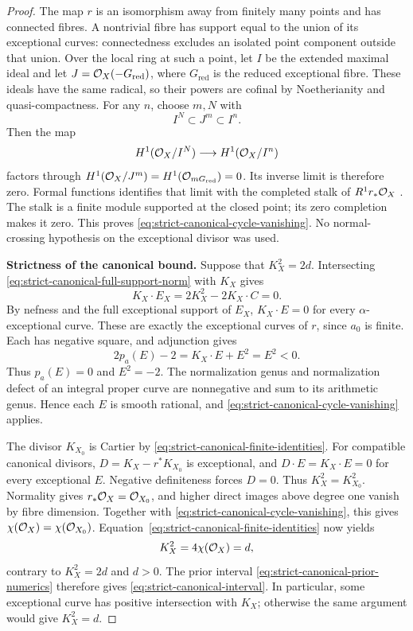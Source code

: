 \begin{proof}
The map $r$ is an isomorphism away from finitely many points
and has connected fibres.  A nontrivial fibre has support
equal to the union of its exceptional curves: connectedness
excludes an isolated point component outside that union.
Over the local ring at such a point, let $I$ be the extended
maximal ideal and let $J=\mathcal O_X(-G_{\mathrm{red}})$, where
$G_{\mathrm{red}}$ is the reduced exceptional fibre.
These ideals have the same radical, so their powers are cofinal
by Noetherianity and quasi-compactness.
For any $n$, choose $m,N$ with
\[
 I^N\subset J^m\subset I^n.
\]
Then the map
\[
 H^1(\mathcal O_X/I^N)\longrightarrow H^1(\mathcal O_X/I^n)
\]
factors through
$H^1(\mathcal O_X/J^m)=H^1(\mathcal O_{mG_{\mathrm{red}}})=0$.
Its inverse limit is therefore zero.
Formal functions identifies that limit with the completed
stalk of $R^1r_*\mathcal O_X$
\cite[Theorem~30.20.5, Tag~02OC]{Stacks}.
The stalk is a finite module supported at the closed point;
its zero completion makes it zero.  This proves
\eqref{eq:strict-canonical-cycle-vanishing}.
No normal-crossing hypothesis on the exceptional divisor was used.

\par\smallskip\noindent\textbf{Strictness of the canonical bound.}
Suppose that $K_X^2=2d$.  Intersecting
\eqref{eq:strict-canonical-full-support-norm} with $K_X$ gives
\[
 K_X\cdot E_X=2K_X^2-2K_X\cdot C=0.
\]
By nefness and the full exceptional support of $E_X$,
$K_X\cdot E=0$ for every $\alpha$-exceptional curve.
These are exactly the exceptional curves of $r$, since
$a_0$ is finite.  Each has negative square, and adjunction gives
\[
 2p_a(E)-2=K_X\cdot E+E^2=E^2<0.
\]
Thus $p_a(E)=0$ and $E^2=-2$.
The normalization genus and normalization defect of an integral
proper curve are nonnegative and sum to its arithmetic genus.
Hence each $E$ is smooth rational, and
\eqref{eq:strict-canonical-cycle-vanishing} applies.

The divisor $K_{X_0}$ is Cartier by
\eqref{eq:strict-canonical-finite-identities}.
For compatible canonical divisors,
$D=K_X-r^*K_{X_0}$ is exceptional, and
$D\cdot E=K_X\cdot E=0$ for every exceptional $E$.
Negative definiteness forces $D=0$.
Thus $K_X^2=K_{X_0}^2$.
Normality gives $r_*\mathcal O_X=\mathcal O_{X_0}$, and higher direct
images above degree one vanish by fibre dimension.
Together with \eqref{eq:strict-canonical-cycle-vanishing},
this gives $\chi(\mathcal O_X)=\chi(\mathcal O_{X_0})$.
Equation~\eqref{eq:strict-canonical-finite-identities} now yields
\[
 K_X^2=4\chi(\mathcal O_X)=d,
\]
contrary to $K_X^2=2d$ and $d>0$.
The prior interval \eqref{eq:strict-canonical-prior-numerics}
therefore gives \eqref{eq:strict-canonical-interval}.
In particular, some exceptional curve has positive intersection
with $K_X$; otherwise the same argument would give $K_X^2=d$.


\end{proof}
